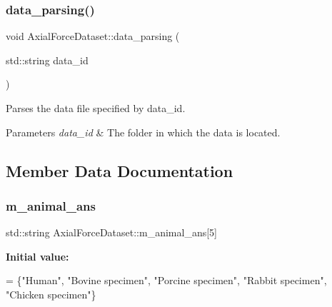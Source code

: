 \subsubsection{\texorpdfstring{data\+\_\+parsing()}{data\_parsing()}}
{\footnotesize\ttfamily void Axial\+Force\+Dataset\+::data\+\_\+parsing (\begin{DoxyParamCaption}\item[{std\+::string}]{data\+\_\+id }\end{DoxyParamCaption})}

Parses the data file specified by data\+\_\+id. 
\begin{DoxyParams}{Parameters}
{\em data\+\_\+id} & The folder in which the data is located. \\
\hline
\end{DoxyParams}


\subsection{Member Data Documentation}
\mbox{\label{classAxialForceDataset_a46870d776e23f6d7f6d2a58d5f0f24f4}} 
\subsubsection{\texorpdfstring{m\+\_\+animal\+\_\+ans}{m\_animal\_ans}}
{\footnotesize\ttfamily std\+::string Axial\+Force\+Dataset\+::m\+\_\+animal\+\_\+ans\mbox{[}5\mbox{]}\hspace{0.3cm}{\ttfamily [protected]}}

{\bfseries Initial value\+:}
\begin{DoxyCode}
= \{\textcolor{stringliteral}{"Human"}, \textcolor{stringliteral}{"Bovine specimen"}, 
        \textcolor{stringliteral}{"Porcine specimen"}, \textcolor{stringliteral}{"Rabbit specimen"}, \textcolor{stringliteral}{"Chicken specimen"}\}
\end{DoxyCode}
\mbox{\label{classAxialForceDataset_abccf621b7f287892b380cbd1c3ee0199}} 
